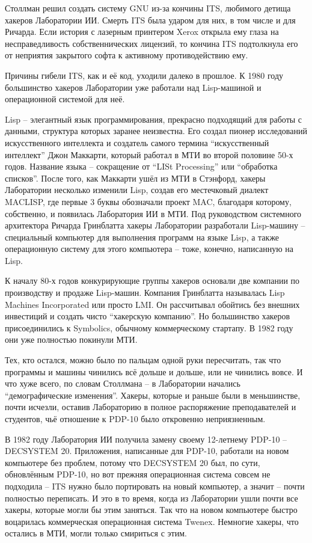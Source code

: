 Столлман решил создать систему GNU из-за кончины ITS, любимого детища хакеров Лаборатории ИИ. Смерть ITS была ударом для них, в том числе и для Ричарда. Если история с лазерным принтером Xerox открыла ему глаза на несправедливость собственнических лицензий, то кончина ITS подтолкнула его от неприятия закрытого софта к активному противодействию ему.

Причины гибели ITS, как и её код, уходили далеко в прошлое. К 1980 году большинство хакеров Лаборатории уже работали над Lisp-машиной и операционной системой для неё.

Lisp -- элегантный язык программирования, прекрасно подходящий для работы с данными, структура которых заранее неизвестна. Его создал пионер исследований искусственного интеллекта и создатель самого термина \enquote{искусственный интеллект} Джон Маккарти, который работал в МТИ во второй половине 50-х годов. Название языка -- сокращение от \enquote{LISt Processing} или \enquote{обработка списков}. После того, как Маккарти ушёл из МТИ в Стэнфорд, хакеры Лаборатории несколько изменили Lisp, создав его местечковый диалект MACLISP, где первые 3 буквы обозначали проект MAC, благодаря которому, собственно, и появилась Лаборатория ИИ в МТИ. Под руководством системного архитектора Ричарда Гринблатта хакеры Лаборатории разработали Lisp-машину -- специальный компьютер для выполнения программ на языке Lisp, а также операционную систему для этого компьютера -- тоже, конечно, написанную на Lisp.

К началу 80-х годов конкурирующие группы хакеров основали две компании по производству и продаже Lisp-машин. Компания Гринблатта называлась Lisp Machines Incorporated или просто LMI. Он рассчитывал обойтись без внешних инвестиций и создать чисто \enquote{хакерскую компанию}. Но большинство хакеров присоединились к Symbolics, обычному коммерческому стартапу. В 1982 году они уже полностью покинули МТИ.

Тех, кто остался, можно было по пальцам одной руки пересчитать, так что программы и машины чинились всё дольше и дольше, или не чинились вовсе. И что хуже всего, по словам Столлмана -- в Лаборатории начались \enquote{демографические изменения}. Хакеры, которые и раньше были в меньшинстве, почти исчезли, оставив Лабораторию в полное распоряжение преподавателей и студентов, чьё отношение к PDP-10 было откровенно неприязненным.

В 1982 году Лаборатория ИИ получила замену своему 12-летнему PDP-10 -- DECSYSTEM 20. Приложения, написанные для PDP-10, работали на новом компьютере без проблем, потому что DECSYSTEM 20 был, по сути, обновлённым PDP-10, но вот прежняя операционная система совсем не подходила -- ITS нужно было портировать на новый компьютер, а значит -- почти полностью переписать. И это в то время, когда из Лаборатории ушли почти все хакеры, которые могли бы этим заняться. Так что на новом компьютере быстро воцарилась коммерческая операционная система Twenex. Немногие хакеры, что остались в МТИ, могли только смириться с этим.

